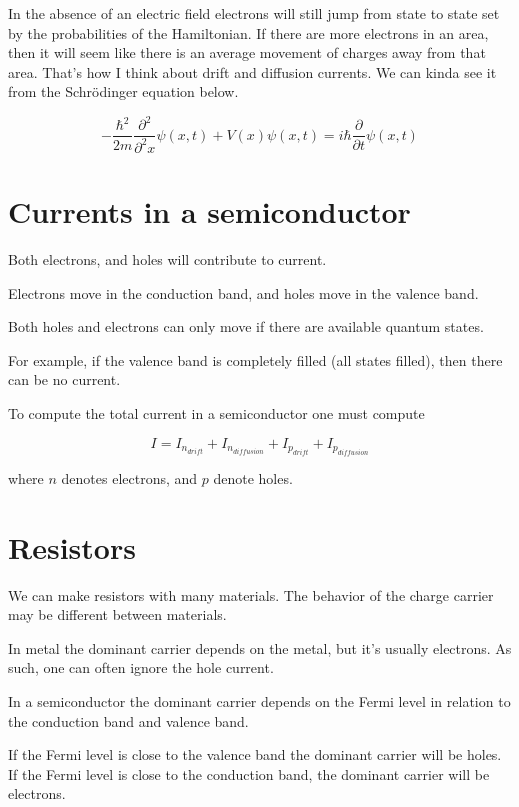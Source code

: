 In the absence of an electric field electrons will still jump from state
to state set by the probabilities of the Hamiltonian. If there are more
electrons in an area, then it will seem like there is an average
movement of charges away from that area. That's how I think about drift
and diffusion currents. We can kinda see it from the Schrödinger
equation below.

\[-\frac{\hbar^2}{2 m} \frac{\partial^2}{\partial^2 x}\psi(x,t) +
V(x)\psi(x,t) = i\hbar\frac{\partial}{\partial t} \psi(x,t) \]

\section{Currents in a semiconductor}\label{currents-in-a-semiconductor}

Both electrons, and holes will contribute to current.

Electrons move in the conduction band, and holes move in the valence
band.

Both holes and electrons can only move if there are available quantum
states.

For example, if the valence band is completely filled (all states
filled), then there can be no current.

To compute the total current in a semiconductor one must compute

\[ I  = I_{n_{drift}} +I_{n_{diffusion}} + I_{p_{drift}}  + I_{p_{diffusion}}\]

where \(n\) denotes electrons, and \(p\) denote holes.

\section{Resistors}\label{resistors}

We can make resistors with many materials. The behavior of the charge
carrier may be different between materials.

In metal the dominant carrier depends on the metal, but it's usually
electrons. As such, one can often ignore the hole current.

In a semiconductor the dominant carrier depends on the Fermi level in
relation to the conduction band and valence band.

If the Fermi level is close to the valence band the dominant carrier
will be holes. If the Fermi level is close to the conduction band, the
dominant carrier will be electrons.

